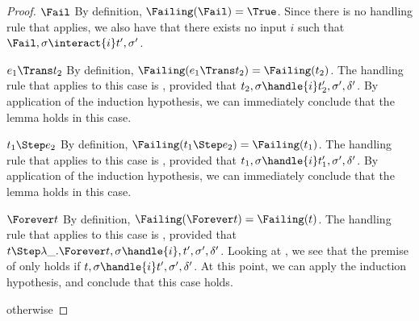 \begin{proof}
\case
  {$\Fail$}
  {By definition, $\Failing(\Fail)= \True$. Since there is no handling rule that applies, we also have that there exists no input $i$ such that $\Fail,\sigma\interact{i} t',\sigma'$.}

\case
  {$e_1 \Trans t_2$}
  {By definition, $\Failing(e_1 \Trans t_2)= \Failing(t_2)$.
  The handling rule that applies to this case is , provided that $t_2,\sigma\handle{i}t_2',\sigma',\delta'$.
  By application of the induction hypothesis, we can immediately conclude that the lemma holds in this case.}

\case
  {$t_1 \Step e_2$}
  {By definition, $\Failing(t_1 \Step e_2)= \Failing(t_1)$.
  The handling rule that applies to this case is , provided that $t_1,\sigma\handle{i}t_1',\sigma',\delta'$.
  By application of the induction hypothesis, we can immediately conclude that the lemma holds in this case.}

\case
  {$\Forever t$}
  {By definition, $\Failing(\Forever t)=\Failing(t)$.
  The handling rule that applies to this case is , provided that $t\Step \lambda\_.\Forever t,\sigma\handle{i},t',\sigma',\delta'$. Looking at , we see that the premise of  only holds if $t,\sigma\handle{i}t',\sigma',\delta'$.
  At this point, we can apply the induction hypothesis, and conclude that this case holds.}

\case
  {otherwise}
  {}

\end{proof}
